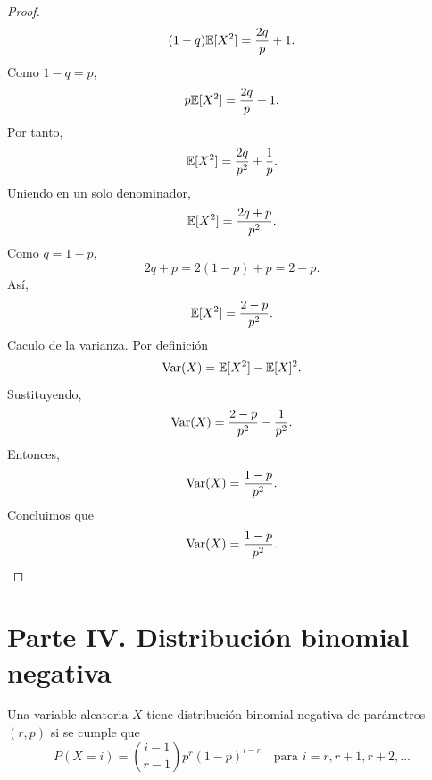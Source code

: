 \documentclass[12pt,a4paper]{article}
\begin{document}
\begin{proof}
\begin{equation*}
            (1-q)\mathbb{E}[X^{2}]=\frac{2q}{p}+1.
        \end{equation*}
        Como $1-q=p$,
        \begin{equation*}
            p\mathbb{E}[X^{2}]=\frac{2q}{p}+1.
        \end{equation*}
        Por tanto,
        \begin{equation*}
            \mathbb{E}[X^{2}]=\frac{2q}{p^{2}}+\frac{1}{p}.
        \end{equation*}
        Uniendo en un solo denominador,
        \begin{equation*}
            \mathbb{E}[X^{2}]=\frac{2q+p}{p^{2}}.
        \end{equation*}
        Como $q=1-p$,
        \begin{equation*}
            2q+p=2(1-p)+p=2-p.
        \end{equation*}
        Así,
        \begin{equation*}
            \mathbb{E}[X^{2}]=\frac{2-p}{p^{2}}.
        \end{equation*}
        Caculo de la varianza. Por definición
        \begin{equation*}
            \operatorname{Var}(X)=\mathbb{E}[X^{2}]-\mathbb{E}[X]^{2}.
        \end{equation*}
        Sustituyendo,
        \begin{equation*}
            \operatorname{Var}(X)=\frac{2-p}{p^{2}}-\frac{1}{p^{2}}.
        \end{equation*}
        Entonces,
        \begin{equation*}
            \operatorname{Var}(X)=\frac{1-p}{p^{2}}.
        \end{equation*}
        Concluimos que
        \begin{equation*}
            \operatorname{Var}(X)=\frac{1-p}{p^{2}}.
        \end{equation*}
    \end{proof}

    \section*{Parte IV. Distribución binomial negativa}

    Una variable aleatoria $X$ tiene distribución binomial negativa de parámetros $(r, p)$ si se cumple que
    \begin{equation*}
        P(X = i) = \binom{i-1}{r-1} p^r (1-p)^{i-r} \quad \text{para } i = r, r+1, r+2, \ldots
    \end{equation*}
\end{document}
